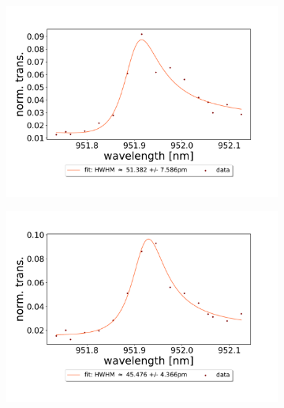 \begin{figure}[h!]
\begin{subfigure}[b]{0.49\textwidth}
        \includegraphics[width=\textwidth]{figures/results/double fano fits/20250326/251um_M3:M5_fit_5.pdf}
        \caption{}
        \label{fig:251um_M3:M5_fit_5}
    \end{subfigure}
    \begin{subfigure}[b]{0.49\textwidth}
        \includegraphics[width=\textwidth]{figures/results/double fano fits/20250326/251um_M3:M5_fit_6.pdf}
        \caption{}
        \label{fig:251um_M3:M5_fit_6}
    \end{subfigure}
\end{figure}
